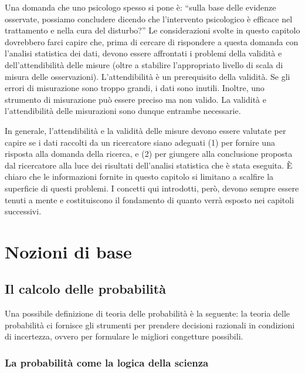 \documentclass[
  11pt,
]{krantz}
\theoremstyle{definition}
\theoremstyle{definition}
\theoremstyle{definition}
\theoremstyle{definition}
\theoremstyle{remark}
\begin{document}
Una domanda che uno psicologo spesso si pone è: ``sulla base delle evidenze osservate, possiamo concludere dicendo che l'intervento psicologico è efficace nel trattamento e nella cura del disturbo?'' Le considerazioni svolte in questo capitolo dovrebbero farci capire che, prima di cercare di rispondere a questa domanda con l'analisi statistica dei dati, devono essere affrontati i problemi della validità e dell'attendibilità delle misure (oltre a stabilire l'appropriato livello di scala di misura delle osservazioni). L'attendibilità è un prerequisito della validità. Se gli errori di misurazione sono troppo grandi, i dati sono inutili. Inoltre, uno strumento di misurazione può essere preciso ma non valido. La validità e l'attendibilità delle misurazioni sono dunque entrambe necessarie.

In generale, l'attendibilità e la validità delle misure devono essere valutate per capire se i dati raccolti da un ricercatore siano adeguati (1) per fornire una risposta alla domanda della ricerca, e (2) per giungere alla conclusione proposta dal ricercatore alla luce dei risultati dell'analisi statistica che è stata eseguita. È chiaro che le informazioni fornite in questo capitolo si limitano a scalfire la superficie di questi problemi. I concetti qui introdotti, però, devono sempre essere tenuti a mente e costituiscono il fondamento di quanto verrà esposto nei capitoli successivi.

\mainmatter

\hypertarget{part-nozioni-di-base}{%
\part*{Nozioni di base}\label{part-nozioni-di-base}}


\hypertarget{intro-prob-1}{%
\chapter{Il calcolo delle probabilità}\label{intro-prob-1}}

Una possibile definizione di teoria delle probabilità è la seguente: la teoria delle probabilità ci fornisce gli strumenti per prendere decisioni razionali in condizioni di incertezza, ovvero per formulare le migliori congetture possibili.

\hypertarget{inf-stat-probl-inv}{%
\section{La probabilità come la logica della scienza}\label{inf-stat-probl-inv}}
\end{document}
